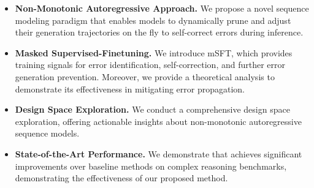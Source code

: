 \begin{itemize}[noitemsep, topsep=-1pt, leftmargin=*] 
    \item \textbf{Non-Monotonic Autoregressive Approach.} We propose a novel sequence modeling paradigm that enables models to dynamically prune and adjust their generation trajectories on the fly to self-correct errors during inference.
    \item \textbf{Masked Supervised-Finetuning.} 
    We introduce mSFT, which provides training signals for error identification, self-correction, and further error generation prevention. 
    Moreover, we provide a theoretical analysis to demonstrate its effectiveness in mitigating error propagation.
    \item \textbf{Design Space Exploration.} We conduct a comprehensive design space exploration, offering actionable insights about non-monotonic autoregressive sequence models.
    \item \textbf{State-of-the-Art Performance.} We demonstrate that \modelname achieves significant improvements over baseline methods on complex reasoning benchmarks, demonstrating the effectiveness of our proposed method. 
\end{itemize}